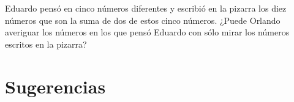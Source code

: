 \documentclass[11pt]{scrartcl}
\begin{document}
\begin{problem}
Eduardo pensó en cinco números diferentes y escribió en la pizarra los diez números que son la suma de dos de estos cinco números. ¿Puede Orlando averiguar los números en los que pensó Eduardo con sólo mirar los números escritos en la pizarra?
\end{problem}


\section{Sugerencias}
\begin{enumerate}

\end{enumerate}
\end{document}
